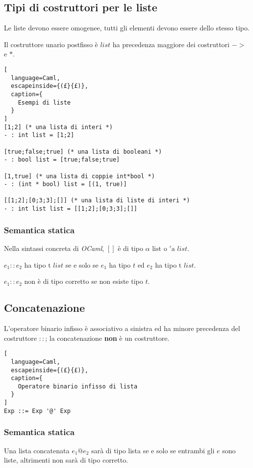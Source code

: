 \subsection{Tipi di costruttori per le liste}
Le liste devono essere omogenee, tutti gli elementi devono essere dello stesso
tipo.


Il costruttore unario postfisso è $list$ ha precedenza maggiore dei
costruttori $->$ e $*$.

\begin{lstlisting}[
  language=Caml,
  escapeinside={(£}{£)},
  caption={
    Esempi di liste
  }
]
[1;2] (* una lista di interi *)
- : int list = [1;2]

[true;false;true] (* una lista di booleani *)
- : bool list = [true;false;true]

[1,true] (* una lista di coppie int*bool *)
- : (int * bool) list = [(1, true)]

[[1;2];[0;3;3];[]] (* una lista di liste di interi *)
- : int list list = [[1;2];[0;3;3];[]]
\end{lstlisting}

\subsubsection{Semantica statica}
Nella sintassi concreta di \emph{OCaml}, $[]$ è di tipo $\alpha\text{ list}$ o
$' \text{a } list$.

$e_1::e_2$ ha tipo $\text{t }list$ se e solo se $e_1$ ha tipo $t$ ed $e_2$ ha
tipo $\text{t }list$.

$e_1::e_2$ non è di tipo corretto se non esiste tipo $t$.

\subsection{Concatenazione}
L'operatore binario infisso è associativo a sinistra ed ha minore precedenza
del costruttore $::$; la concatenazione \textbf{non} è un costruttore.
\begin{lstlisting}[
  language=Caml,
  escapeinside={(£}{£)},
  caption={
    Operatore binario infisso di lista
  }
]
Exp ::= Exp '@' Exp
\end{lstlisting}

\subsubsection{Semantica statica}
Una lista concatenata $e_1@e_2$ sarà di tipo lista se e solo se entrambi gli
$e$ sono liste, altrimenti non sarà di tipo corretto.

